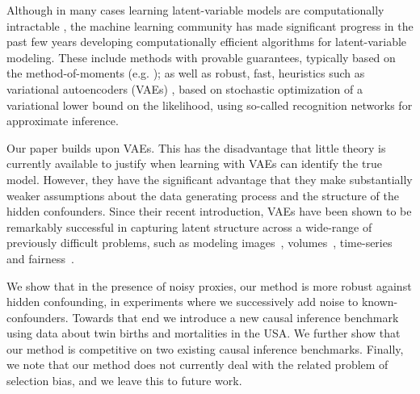 Although in many cases learning latent-variable models are computationally intractable \citep{thiesson1998learning,arora2005learning}, the machine learning community has made significant progress in the past few years developing computationally efficient algorithms for latent-variable modeling. These include methods with provable guarantees, typically based on the method-of-moments (e.g. \citet{anandkumar2012method}); as well as robust, fast, heuristics such as variational autoencoders (VAEs) \citep{kingma2013auto,rezende2014stochastic}, based on stochastic optimization of a variational lower bound on the likelihood, using so-called recognition networks for approximate inference.

Our paper builds upon VAEs. This has the disadvantage that little theory is currently available to justify when learning with VAEs can identify the true model. However, they have the significant advantage that they make substantially weaker assumptions about the data generating process and the structure of the hidden confounders. Since their recent introduction, VAEs have been shown to be remarkably successful in capturing latent structure across a wide-range of previously difficult problems, such as modeling images~\citep{gregor2015draw}, volumes~\citep{rezende2016unsupervised}, time-series~\citep{chung2015recurrent} and fairness~\citep{louizos2015variational}.

We show that in the presence of noisy proxies, our method is more robust against hidden confounding, in experiments where we successively add noise to known-confounders. Towards that end we introduce a new causal inference benchmark using data about twin births and mortalities in the USA. We further show that our method is competitive on two existing causal inference benchmarks. 
Finally, we note that our method does not currently deal with the related problem of selection bias, and we leave this to future work.







